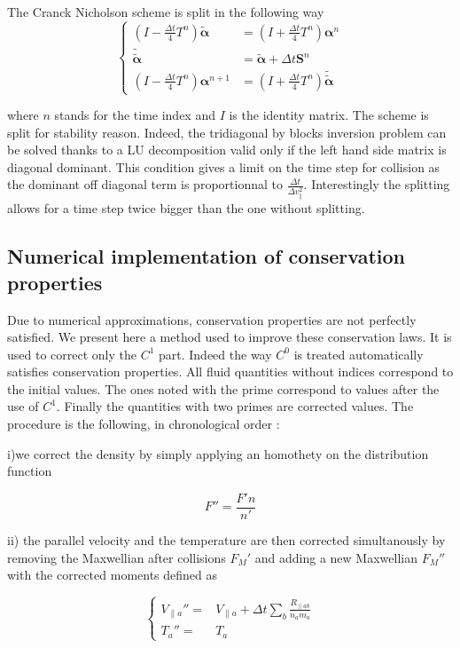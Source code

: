 \documentclass[11pt,preprint]{elsarticle}
\begin{document}
The Cranck Nicholson scheme is split in the following way
\[
\begin{cases}
\left(I-\frac{\Delta t}{4}T^{n}\right)\tilde{\boldsymbol{\alpha}} & =\left(I+\frac{\Delta t}{4}T^{n}\right)\boldsymbol{\alpha}^{n}\\
\tilde{\tilde{\boldsymbol{\alpha}}} & =\tilde{\boldsymbol{\alpha}}+\Delta t\boldsymbol{S}^{n}\\
\left(I-\frac{\Delta t}{4}T^{n}\right)\boldsymbol{\alpha}^{n+1} & =\left(I+\frac{\Delta t}{4}T^{n}\right)\tilde{\tilde{\boldsymbol{\alpha}}}
\end{cases}
\]


where $n$ stands for the time index and $I$ is the identity matrix.
The scheme is split for stability reason. Indeed, the tridiagonal
by blocks inversion problem can be solved thanks to a LU decomposition
valid only if the left hand side matrix is diagonal dominant. This
condition gives a limit on the time step for collision as the dominant
off diagonal term is proportionnal to $\frac{\Delta t}{\Delta v_{\parallel}^{2}}$.
Interestingly the splitting allows for a time step twice bigger than
the one without splitting.


\subsection{Numerical implementation of conservation properties}

Due to numerical approximations, conservation properties are not perfectly satisfied. We present here a method used to improve these conservation laws. It is used to correct only the $C^{1}$ part. Indeed the way $C^{0}$ is treated automatically satisfies conservation properties.
All fluid quantities without indices correspond to the initial values. The ones noted with the prime correspond to values after the use of $C^{1}$. Finally the quantities with two primes are corrected values. The procedure is the following, in chronological order :

i)we correct the density by simply applying an homothety on the distribution
function

\[
F''=\frac{F'n}{n'}
\]


ii) the parallel velocity and the temperature are then corrected simultanously
by removing the Maxwellian after collisions $F_{M}'$ and adding a
new Maxwellian $F_{M}''$ with the corrected moments defined as

\[
\begin{cases}
V_{\parallel a}''= & V_{\parallel a}+\Delta t\sum_{b}\frac{R_{\parallel ab}}{n_{a}m_{a}}\\
T_{a}''= & T_{a}
\end{cases}
\]
\end{document}

